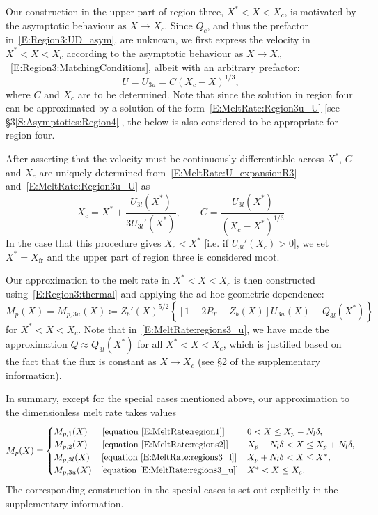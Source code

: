 \documentclass[openacc]{rsproca_new}%
\newcommand{\lt}{\delta} %
\newcommand{\Pt}{\textit{P}_T}
\begin{document}
Our construction in the upper part of region three, $X^* < X < X_c$, is motivated by the asymptotic behaviour as $X \to X_c$. Since $Q_c$, and thus the prefactor in~\eqref{E:Region3:UD_asym}, are unknown, we first express the velocity in $X^* < X < X_c$ according to the asymptotic behaviour as $X\to X_c$~\eqref{E:Region3:MatchingConditions}, albeit with an arbitrary prefactor:
\begin{equation}\label{E:MeltRate:Region3u_U}
U =U_{3u} =  C (X_c - X)^{1/3},
\end{equation} 
where $C$ and $X_c$ are to be determined. Note that since the solution in region four can be approximated by a solution of the form~\eqref{E:MeltRate:Region3u_U} [see \S3\ref{S:Asymptotics:Region4}], the below is also considered to be appropriate for region four.

After asserting that the velocity must be continuously differentiable across $X^*$, $C$ and $X_c$ are uniquely determined from~\eqref{E:MeltRate:U_expansionR3} and~\eqref{E:MeltRate:Region3u_U} as
\begin{equation}\label{E:MeltRate:Xc_expression}
X_c = X^* + \frac{U_{3l}(X^*)}{3 U_{3l}'(X^*)}, \qquad C = \frac{U_{3l}(X^*)}{\left(X_c - X^*\right)^{1/3}}
\end{equation}
In the case that this procedure gives $X_c < X^*$ [i.e. if $U_{3l}'(X_c) > 0$], we set $X^* = X_{\text{fr}}$ and the upper part of region three is considered moot.

Our approximation to the melt rate in $X^* < X <X_c$ is then constructed using~\eqref{E:Region3:thermal} and applying the ad-hoc geometric dependence:
\begin{equation}\label{E:MeltRate:regions3_u}
M_p(X) = M_{p,3u}(X) \coloneqq Z_b'(X)^{5/2}\left\{ \left[1  - 2\Pt -  Z_b(X)\right] U_{3u}(X) - Q_{3l}(X^*) \right\}
\end{equation}
for $X^* < X < X_c$. Note that in~\eqref{E:MeltRate:regions3_u}, we have made the approximation $Q \approx Q_{3l}(X^*)$ for all $X^* < X < X_c$, which is justified based on the fact that the flux is constant as $X \to X_c$ (see \S2 of the supplementary information).

In summary, except for the special cases mentioned above, our approximation to the dimensionless melt rate takes values
\begin{equation}\label{E:MeltRate:AllRegions}
M_{p}(X) = \begin{cases} 
M_{p,1}(X) \text{~~\quad [equation~\eqref{E:MeltRate:region1}]}  & 0 < X \leq X_p - N_l \lt,\\
M_{p,2}(X) \text{~~\quad [equation~\eqref{E:MeltRate:regions2}]} & X_p - N_l \lt < X \leq X_p + N_l \lt,\\
M_{p,3l}(X) \text{~\quad [equation~\eqref{E:MeltRate:regions3_l}]} & X_p + N_l \lt < X \leq X^*,\\
M_{p,3u}(X) \text{\quad [equation~\eqref{E:MeltRate:regions3_u}]} & X^* < X \leq X_c.
\end{cases}
\end{equation}
The corresponding construction in the special cases is set out explicitly in the supplementary information.
\end{document}
